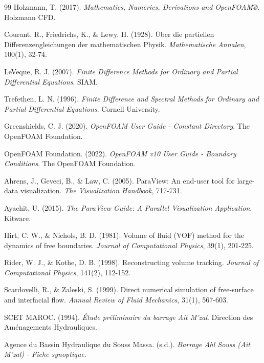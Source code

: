 \begin{thebibliography}{99}
Holzmann, T. (2017). \emph{Mathematics, Numerics, Derivations and OpenFOAM®}. Holzmann CFD.

Courant, R., Friedrichs, K., \& Lewy, H. (1928). Über die partiellen Differenzengleichungen der mathematischen Physik. \emph{Mathematische Annalen}, 100(1), 32-74.

LeVeque, R. J. (2007). \emph{Finite Difference Methods for Ordinary and Partial Differential Equations}. SIAM.

Trefethen, L. N. (1996). \emph{Finite Difference and Spectral Methods for Ordinary and Partial Differential Equations}. Cornell University.

Greenshields, C. J. (2020). \emph{OpenFOAM User Guide - Constant Directory}. The OpenFOAM Foundation.

OpenFOAM Foundation. (2022). \emph{OpenFOAM v10 User Guide - Boundary Conditions}. The OpenFOAM Foundation.

Ahrens, J., Geveci, B., \& Law, C. (2005). ParaView: An end-user tool for large-data visualization. \emph{The Visualization Handbook}, 717-731.

Ayachit, U. (2015). \emph{The ParaView Guide: A Parallel Visualization Application}. Kitware.

Hirt, C. W., \& Nichols, B. D. (1981). Volume of fluid (VOF) method for the dynamics of free boundaries. \emph{Journal of Computational Physics}, 39(1), 201-225.

Rider, W. J., \& Kothe, D. B. (1998). Reconstructing volume tracking. \emph{Journal of Computational Physics}, 141(2), 112-152.

Scardovelli, R., \& Zaleski, S. (1999). Direct numerical simulation of free-surface and interfacial flow. \emph{Annual Review of Fluid Mechanics}, 31(1), 567-603.

SCET MAROC. (1994). \emph{Étude préliminaire du barrage Ait M'zal}. Direction des Aménagements Hydrauliques.

Agence du Bassin Hydraulique du Souss Massa. (s.d.). \emph{Barrage Ahl Souss (Ait M'zal) - Fiche synoptique}.


\end{thebibliography}
